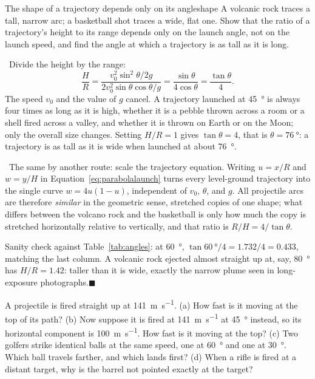 \documentclass[11pt,twoside,openany]{book}
\newcounter{check}[chapter]
\newcommand{\viewtag}[3]{\fcolorbox{#2}{#3}{\footnotesize\textbf{\textcolor{#2}{#1}}}}
\newcommand{\elemtag}{\viewtag{Elementary}{elemcol}{elempale}}
\newcommand{\calctag}{\viewtag{Calculus}{calccol}{calcpale}}
\newcommand{\elem}{\par\medskip\noindent\elemtag\ }
\newcommand{\calc}{\par\medskip\noindent\calctag\ }
\newcommand{\qed}{\hfill$\blacksquare$}
\begin{document}
\begin{example}{The shape of a trajectory depends only on its angle}{shape}
A volcanic rock traces a tall, narrow arc; a basketball shot traces a wide, flat one. Show that the ratio of a trajectory's height to its range depends only on the launch angle, not on the launch speed, and find the angle at which a trajectory is as tall as it is long.

\elem Divide the height by the range:
\[
\frac{H}{R} = \frac{v_0^{2}\sin^{2}\theta/2g}{2v_0^{2}\sin\theta\cos\theta/g}
= \frac{\sin\theta}{4\cos\theta} = \frac{\tan\theta}{4}.
\]
The speed $v_0$ and the value of $g$ cancel. A trajectory launched at \SI{45}{\degree} is always four times as long as it is high, whether it is a pebble thrown across a room or a shell fired across a valley, and whether it is thrown on Earth or on the Moon; only the overall size changes. Setting $H/R = 1$ gives $\tan\theta = 4$, that is $\theta = \SI{76}{\degree}$: a trajectory is as tall as it is wide when launched at about \SI{76}{\degree}.

\calc The same by another route: scale the trajectory equation. Writing $u = x/R$ and $w = y/H$ in Equation~\eqref{eq:parabolalaunch} turns every level-ground trajectory into the single curve $w = 4u(1-u)$, independent of $v_0$, $\theta$, and $g$. All projectile arcs are therefore \emph{similar} in the geometric sense, stretched copies of one shape; what differs between the volcano rock and the basketball is only how much the copy is stretched horizontally relative to vertically, and that ratio is $R/H = 4/\tan\theta$.

Sanity check against Table~\ref{tab:angles}: at \SI{60}{\degree}, $\tan\SI{60}{\degree}/4 = 1.732/4 = \num{0.433}$, matching the last column. A volcanic rock ejected almost straight up at, say, \SI{80}{\degree} has $H/R = \num{1.42}$: taller than it is wide, exactly the narrow plume seen in long-exposure photographs.\qed
\end{example}

\begin{checkbox}
A projectile is fired straight up at \SI{141}{\metre\per\second}. (a) How fast is it moving at the top of its path? (b) Now suppose it is fired at \SI{141}{\metre\per\second} at \SI{45}{\degree} instead, so its horizontal component is \SI{100}{\metre\per\second}. How fast is it moving at the top? (c) Two golfers strike identical balls at the same speed, one at \SI{60}{\degree} and one at \SI{30}{\degree}. Which ball travels farther, and which lands first? (d) When a rifle is fired at a distant target, why is the barrel not pointed exactly at the target?
\end{checkbox}
\end{document}
